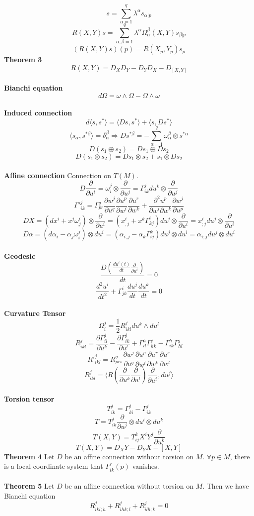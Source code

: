\documentclass{article}
\begin{document}
\[s = \sum_{\alpha=1}^{q} \lambda^{\alpha} s_{\alpha|p}\]
\[R(X,Y)s = \sum_{\alpha,\beta=1}^{q} \lambda^{\alpha} \Omega^{\beta}_{\alpha}(X,Y)s_{\beta|p}\]
\[(R(X,Y)s)(p) = R(X_p,Y_p)s_p\]
\textbf{Theorem 3}\\
\[R(X,Y) = D_X D_Y - D_Y D_X -D_{[X,Y]}\]\\
\textbf{Bianchi equation}\\
\[d\Omega = \omega \wedge \Omega - \Omega \wedge \omega\]\\
\textbf{Induced connection}\\
\[d\langle s,s^* \rangle = \langle Ds,s^* \rangle + \langle s,Ds^* \rangle\]
\[\langle s_{\alpha},s^{*\beta} \rangle  = \delta^{\beta}_{\alpha}  \Rightarrow Ds^{*\beta} = -\sum_{\alpha=1}^{q} \omega^{\beta}_{\alpha} \otimes s^{*\alpha}\]
\[D(s_1 \oplus s_2) = Ds_1 \oplus Ds_2\]
\[D(s_1 \otimes s_2) = Ds_1 \otimes s_2 + s_1 \otimes Ds_2\]\\
\textbf{Affine connection} Connection on $T(M)$.\\
\[D\frac{\partial}{\partial u^i} = \omega^j_i \otimes \frac{\partial}{\partial u^j} = \Gamma^{j}_{ik} du^k \otimes \frac{\partial}{\partial u^j}\]
\[\Gamma'^{j}_{ik} = \Gamma^{q}_{pr} \frac{\partial w^j}{\partial u^q} \frac{\partial u^p}{\partial w^i} \frac{\partial u^r}{\partial w^k} + \frac{\partial^2 u^p}{\partial w^i \partial w^k} \frac{\partial w^j}{\partial u^p}\]
\[DX = (dx^i + x^j \omega^i_j)\otimes \frac{\partial}{\partial u^i} = (x^i_{,j} + x^k \Gamma^{i}_{kj}) du^j \otimes \frac{\partial}{\partial u^i} = x^i_{;j}du^j \otimes \frac{\partial}{\partial u^i} \]
\[D \alpha = (d\alpha_i - \alpha_j \omega^j_i)\otimes du^i = (\alpha_{i,j} -\alpha_k \Gamma^k_{ij})du^j \otimes du^i = \alpha_{i;j} du^j \otimes du^i \]\\
\textbf{Geodesic}
\[\frac{D(\frac{du^i(t)}{dt} \frac{\partial}{\partial u^i})}{dt} = 0 \]
\[\frac{d^2 u^i}{dt^2} + \Gamma^i_{jk} \frac{du^j}{dt} \frac{du^k}{dt} = 0\]\\
\textbf{Curvature Tensor}\\
\[\Omega^j_i = \frac{1}{2}R^j_{ikl} du^k \wedge du^l \]
\[R^j_{ikl} = \frac{\partial \Gamma^j_{il}}{\partial u^k} - \frac{\partial \Gamma^j_{ik}}{\partial u^l} + \Gamma^h_{il} \Gamma^j_{hk} - \Gamma^h_{ik} \Gamma^j_{hl}\] 
\[R'^j_{ikl} = R^q_{prs} \frac{\partial w^j}{\partial u^q} \frac{\partial u^p}{\partial w^i} \frac{\partial u^r}{\partial w^k}\frac{\partial u^s}{\partial w^l}\]
\[R^{j}_{ikl} = \langle R(\frac{\partial}{\partial u^k} \frac{\partial}{\partial u^l})\frac{\partial}{\partial u^i},du^j \rangle\]\\
\textbf{Torsion tensor}
\[T^j_{ik} = \Gamma^j_{ki} - \Gamma^j_{ik}\]
\[T = T^j_{ik} \frac{\partial}{\partial u^j} \otimes du^i \otimes du^k\]
\[T(X,Y) = T^k_{ij}X^i Y^j \frac{\partial}{\partial u^k}\]
\[T(X,Y) = D_X Y - D_Y X - [X,Y]\]
\textbf{Theorem 4} Let $D$ be an affine connection without torsion on $M$. $\forall p \in M$, there is a local coordinate system that $\Gamma^j_{ik}(p)$ vanishes.\\ \\
\textbf{Theorem 5} Let $D$ be an affine connection without torsion on $M$. Then we have Bianchi equation
\[R^j_{ikl;h} + R^j_{ihk;l} + R^j_{ilh;k} = 0\]
\end{document}
